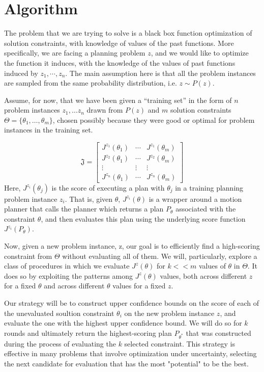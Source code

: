 \section{Algorithm}
The problem that we are trying to solve
is a black box function optimization of solution constraints, with
knowledge of values of the past functions. More 
specifically, we are
facing a planning problem $z$, and we would like to 
optimize the function it induces, with the knowledge of 
the values of past functions induced by $z_1,\cdots,z_n$.
The main assumption here is that all the problem instances
are sampled from the same probability distribution, i.e. $z \sim P(z)$.


Assume, for now, that we have been given a ``training set'' in the form of
$n$ problem instances $z_1, \ldots z_n$ drawn from $P(z)$ and $m$   
solution constraints $\Theta =\{ \theta_1, \ldots, \theta_m\}$, chosen possibly 
because they were good or optimal for problem instances
 in the training set.

$$\mathfrak{J}=
\begin{bmatrix}
J^{z_1}(\theta_1) &\cdots &J^{z_1}(\theta_m)\\
J^{z_2}(\theta_1) &\cdots &J^{z_2}(\theta_m)\\
\vdots & \vdots & \vdots \\
J^{z_n}(\theta_1) &\cdots &J^{z_n}(\theta_m)
\end{bmatrix}$$
Here, $J^{z_i}(\theta_j)$ is the score of executing a plan with $\theta_j$ in a
training planning problem instance $z_i$. That is, given $\theta$, 
$J^{z_i}(\theta)$ is a wrapper around a motion planner that 
calls the planner which returns a plan $P_\theta$ associated with
 the constraint $\theta$, and then evaluates this plan
using the underlying score function $J^{z_i}(P_\theta)$.


Now, given a new problem instance, z, our goal is to efficiently 
find a high-scoring   constraint from
 $\Theta$ without evaluating all of them.   We will, particularly,
 explore a class of procedures in which we evaluate $J^z(\theta)$
 for $k << m$ values of $\theta$ in $\Theta$. 
 It does so by exploiting the patterns among $J^z(\theta)$ values, 
both across different $z$  for a fixed $\theta$ and 
across different $\theta$ values for a fixed $z$.

Our strategy will be to construct upper confidence bounds on 
the score of each of the unevaluated   soultion constraint
 $\theta_i$ on the new problem instance $z$, and evaluate the one with the highest upper
 confidence bound. We will do so for $k$ rounds and ultimately
return the highest-scoring plan $P_{\theta^*}$ that was constructed during 
the process of evaluating the $k$ selected constraint.  
This strategy is effective in many problems that involve 
optimization under uncertainty, selecting the next candidate 
for evaluation that has the most "potential" to be the best.

